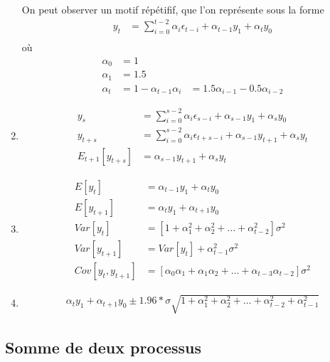 \documentclass{article}
\begin{document}
\begin{enumerate}
  On peut observer un motif répétifif, que l'on représente sous la forme
  \begin{align*}
    y_t &= \sum_{i=0}^{t-2} \alpha_i\epsilon_{t-i} + \alpha_{t-1}y_1 + \alpha_t y_0 \\
  \end{align*}
  où 
  \begin{align*}
    \alpha_0 &= 1\\ 
    \alpha_1 &= 1.5\\
    \alpha_t &= 1-\alpha_{t-1}
    \alpha_i &= 1.5 \alpha_{i-1} - 0.5 \alpha_{i-2}
  \end{align*}
\item 
  \begin{align*}
    y_s &= \sum_{i=0}^{s-2} \alpha_i\epsilon_{s-i} + \alpha_{s-1}y_1 + \alpha_s y_0 \\
    y_{t+s} &= \sum_{i=0}^{s-2} \alpha_i\epsilon_{t+s-i} + \alpha_{s-1}y_{t+1} + \alpha_s y_t \\
    E_{t+1}\left[y_{t+s}\right] &= \alpha_{s-1} y_{t+1} + \alpha_s y_t
  \end{align*}

\item
  \begin{align*}
    E\left[y_t\right] &= \alpha_{t-1} y_1 + \alpha_t y_0 \\
    E\left[y_{t+1}\right] &= \alpha_{t} y_1 + \alpha_{t+1} y_0 \\
    Var\left[y_t\right] &= \left[1+\alpha_1^2 + \alpha_2^2 + \ldots + \alpha_{t-2}^2\right]\sigma^2 \\
    Var\left[y_{t+1}\right] &= Var\left[y_t\right] + \alpha_{t-1}^2 \sigma^2 \\
    Cov\left[y_{t},y_{t+1}\right] &= \left[\alpha_0\alpha_1 + \alpha_1\alpha_2 + \ldots + \alpha_{t-3}\alpha_{t-2}\right] \sigma^2
  \end{align*}
\item
  \begin{align*}
    \alpha_{t} y_1 + \alpha_{t+1} y_0 \pm 1.96 * \sigma \sqrt{1+\alpha_1^2 + \alpha_2^2 + \ldots + \alpha_{t-2}^2+\alpha_{t-1}^2}
  \end{align*}
\end{enumerate}

\clearpage
\subsection{Somme de deux processus}
\end{document}
